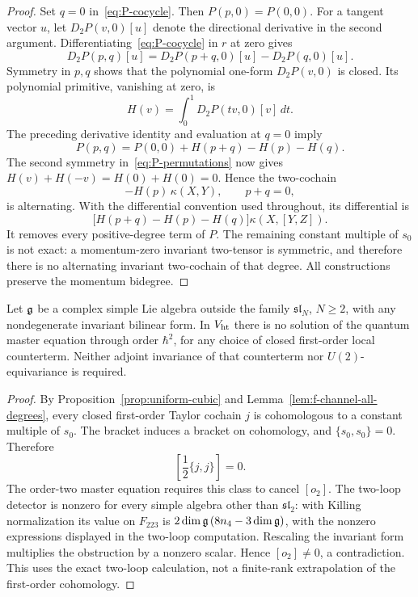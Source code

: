 \begin{proof}
Set $q=0$ in~\eqref{eq:P-cocycle}.  Then $P(p,0)=P(0,0)$.
For a tangent vector $u$, let
$D_2P(v,0)[u]$ denote the directional derivative in the second argument.
Differentiating~\eqref{eq:P-cocycle} in $r$ at zero gives
\begin{equation}
D_2P(p,q)[u]=D_2P(p+q,0)[u]-D_2P(q,0)[u].
\end{equation}
Symmetry in $p,q$ shows that the polynomial one-form
$D_2P(v,0)$ is closed.  Its polynomial primitive, vanishing at zero, is
\begin{equation}
H(v)=\int_0^1D_2P(tv,0)[v]\,dt.
\end{equation}
The preceding derivative identity and evaluation at $q=0$ imply
\begin{equation}
P(p,q)=P(0,0)+H(p+q)-H(p)-H(q).
\label{eq:P-primitive}
\end{equation}
The second symmetry in~\eqref{eq:P-permutations} now gives
$H(v)+H(-v)=H(0)+H(0)=0$.  Hence the two-cochain
\begin{equation}
-H(p)\,\kappa(X,Y),\qquad p+q=0,
\end{equation}
is alternating.  With the differential convention used throughout,
its differential is
\begin{equation}
\bigl[H(p+q)-H(p)-H(q)\bigr]\kappa(X,[Y,Z]).
\end{equation}
It removes every positive-degree term of $P$.  The remaining constant
multiple of $s_0$ is not exact: a momentum-zero invariant two-tensor is
symmetric, and therefore there is no alternating invariant two-cochain
of that degree.  All constructions preserve the momentum bidegree.
\end{proof}

\begin{theorem}
\label{thm:uniform-no-go}
Let $\mathfrak g$ be a complex simple Lie algebra outside the family
$\mathfrak{sl}_N$, $N\ge2$, with any nondegenerate invariant bilinear
form.  In $V_{\mathrm{ht}}$ there is no solution of the quantum master equation
through order $\hbar^2$, for any choice of closed first-order local
counterterm.  Neither adjoint invariance of that counterterm nor
$U(2)$-equivariance is required.
\end{theorem}

\begin{proof}
By Proposition~\ref{prop:uniform-cubic} and
Lemma~\ref{lem:f-channel-all-degrees}, every closed first-order Taylor
cochain $j$ is cohomologous to a constant multiple of $s_0$.
The bracket induces a bracket on cohomology, and
$\{s_0,s_0\}=0$.  Therefore
\begin{equation}
\left[\frac12\{j,j\}\right]=0.
\end{equation}
The order-two master equation requires this class to cancel $[o_2]$.
The two-loop detector is nonzero for every simple algebra other than
$\mathfrak{sl}_2$: with Killing normalization its value on $F_{223}$ is
$2\dim\mathfrak g\,(8n_4-3\dim\mathfrak g)$, with the nonzero expressions displayed in
the two-loop computation.  Rescaling the invariant form multiplies the
obstruction by a nonzero scalar.  Hence $[o_2]\ne0$, a contradiction.
This uses the exact two-loop calculation, not a finite-rank extrapolation
of the first-order cohomology.
\end{proof}

